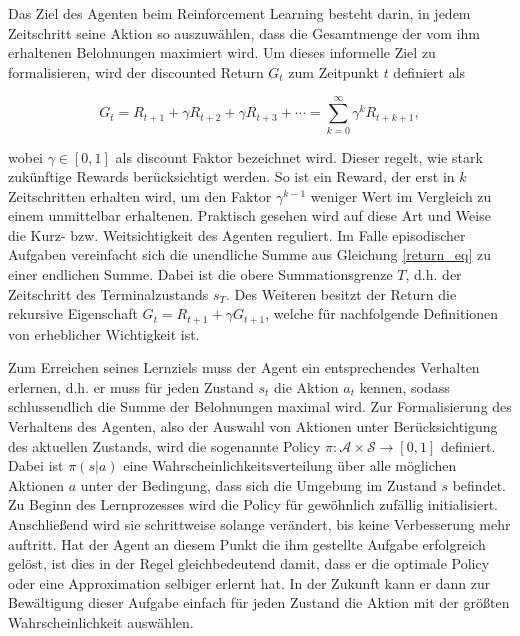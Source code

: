 Das Ziel des Agenten beim Reinforcement Learning besteht darin, in jedem Zeitschritt seine Aktion so auszuwählen, dass die Gesamtmenge der vom ihm erhaltenen Belohnungen maximiert wird. Um dieses informelle Ziel zu formalisieren, wird der discounted Return $G_t$ zum Zeitpunkt $t$ definiert als

\begin{equation}
  G_t = R_{t+1} + \gamma R_{t+2} + \gamma R_{t+3} + \dotsb = \sum_{k=0}^{\infty} \gamma^k R_{t+k+1},
  \label{return_eq}
\end{equation}

wobei $\gamma \in [0, 1]$ als discount Faktor bezeichnet wird. Dieser regelt, wie stark zukünftige Rewards berücksichtigt werden. So ist ein Reward, der erst in $k$ Zeitschritten erhalten wird, um den Faktor $\gamma^{k-1}$ weniger Wert im Vergleich zu einem unmittelbar erhaltenen. Praktisch gesehen wird auf diese Art und Weise die Kurz- bzw. Weitsichtigkeit des Agenten reguliert. Im Falle episodischer Aufgaben vereinfacht sich die unendliche Summe aus Gleichung \eqref{return_eq} zu einer endlichen Summe. Dabei ist die obere Summationsgrenze $T$, d.h. der Zeitschritt des Terminalzustands $s_T$. Des Weiteren besitzt der Return die rekursive Eigenschaft $G_t = R_{t+1} + \gamma G_{t+1}$, welche für nachfolgende Definitionen von erheblicher Wichtigkeit ist.

Zum Erreichen seines Lernziels muss der Agent ein entsprechendes Verhalten erlernen, d.h. er muss für jeden Zustand $s_t$ die Aktion $a_t$ kennen, sodass schlussendlich die Summe der Belohnungen maximal wird. Zur Formalisierung des Verhaltens des Agenten, also der Auswahl von Aktionen unter Berücksichtigung des aktuellen Zustands, wird die sogenannte Policy $\pi: \mathcal{A} \times \mathcal{S} \to [0, 1]$ definiert. Dabei ist $\pi(s|a)$ eine Wahrscheinlichkeitsverteilung über alle möglichen Aktionen $a$ unter der Bedingung, dass sich die Umgebung im Zustand $s$ befindet. Zu Beginn des Lernprozesses wird die Policy für gewöhnlich zufällig initialisiert. Anschließend wird sie schrittweise solange verändert, bis keine Verbesserung mehr auftritt. Hat der Agent an diesem Punkt die ihm gestellte Aufgabe erfolgreich gelöst, ist dies in der Regel gleichbedeutend damit, dass er die optimale Policy oder eine Approximation selbiger erlernt hat. In der Zukunft kann er dann zur Bewältigung dieser Aufgabe einfach für jeden Zustand die Aktion mit der größten Wahrscheinlichkeit auswählen.

